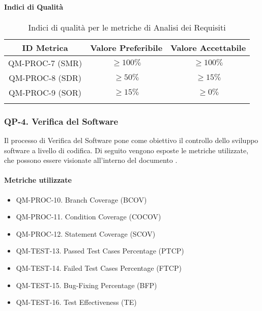 		\paragraph{Indici di Qualità}

			\begin{center}
				\begin{longtable}{|c|c|c|}
				\hline
				\rowcolor{lighter-grayer}
				\textbf{ID Metrica} & \textbf{Valore Preferibile} & \textbf{Valore Accettabile}\\
				\hline
				\endfirsthead
				\hline
				QM-PROC-7 (SMR) & \(\geq 100\%\) & \(\geq 100\%\) \\
				\hline
				QM-PROC-8 (SDR) & \(\geq 50\%\) & \(\geq 15\%\) \\
				\hline
				QM-PROC-9 (SOR) & \(\geq 15\%\) & \(\geq 0\%\) \\
				\hline
				\caption{Indici di qualità per le metriche di Analisi dei Requisiti}
				\end{longtable}
			\end{center}

	\subsubsection{QP-4. Verifica del Software}

		Il processo di Verifica del Software pone come obiettivo il controllo dello sviluppo software a livello di codifica.
		Di seguito vengono esposte le metriche utilizzate, che possono essere visionate all'interno del documento . 

		\paragraph{Metriche utilizzate}

			\begin{itemize}
				\item QM-PROC-10. Branch Coverage (BCOV)
				\item QM-PROC-11. Condition Coverage (COCOV)
				\item QM-PROC-12. Statement Coverage (SCOV)
				\item QM-TEST-13. Passed Test Cases Percentage (PTCP)
				\item QM-TEST-14. Failed Test Cases Percentage (FTCP)
				\item QM-TEST-15. Bug-Fixing Percentage (BFP)
				\item QM-TEST-16. Test Effectiveness (TE)
			\end{itemize}



